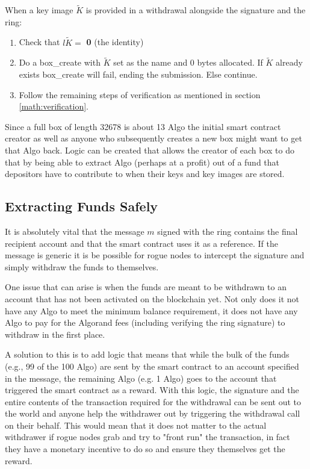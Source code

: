 \documentclass[9pt]{article}
\begin{document}
When a key image $\tilde{K}$ is provided in a withdrawal alongside the signature and the ring:
\begin{enumerate}
    \item Check that $l\tilde{K} =$ \textbf{0} (the identity)
    \item Do a box\_create with $\tilde{K}$ set as the name and 0 bytes allocated. If $\tilde{K}$ already exists box\_create will fail, ending the submission. Else continue.
    \item Follow the remaining steps of verification as mentioned in section \ref{math:verification}.
\end{enumerate}

Since a full box of length 32678 is about 13 Algo the initial smart contract creator as well as anyone who subsequently creates a new box might want to get that Algo back. Logic can be created that allows the creator of each box to do that by being able to extract Algo (perhaps at a profit) out of a fund that depositors have to contribute to when their keys and key images are stored.

\subsection{Extracting Funds Safely}

It is absolutely vital that the message $m$ signed with the ring contains the final recipient account and that the smart contract uses it as a reference. If the message is generic it is be possible for rogue nodes to intercept the signature and simply withdraw the funds to themselves.

One issue that can arise is when the funds are meant to be withdrawn to an account that has not been activated on the blockchain yet. Not only does it not have any Algo to meet the minimum balance requirement, it does not have any Algo to pay for the Algorand fees (including verifying the ring signature) to withdraw in the first place.

A solution to this is to add logic that means that while the bulk of the funds (e.g., 99 of the 100 Algo) are sent by the smart contract to an account specified in the message, the remaining Algo (e.g. 1 Algo) goes to the account that triggered the smart contract as a reward. With this logic, the signature and the entire contents of the transaction required for the withdrawal can be sent out to the world and anyone help the withdrawer out by triggering the withdrawal call on their behalf. This would mean that it does not matter to the actual withdrawer if rogue nodes grab and try to "front run" the transaction, in fact they have a monetary incentive to do so and ensure they themselves get the reward.
\end{document}
